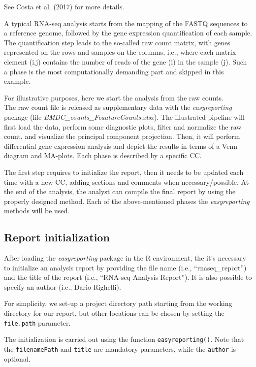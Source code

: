 \documentclass[
]{article}
\begin{document}
See Costa et al. (2017) for more details.

A typical RNA-seq analysis starts from the mapping of the FASTQ
sequences to a reference genome, followed by the gene expression
quantification of each sample. The quantification step leads to the
so-called raw count matrix, with genes represented on the rows and
samples on the columns, i.e., where each matrix element (i,j) contains
the number of reads of the gene (i) in the sample (j). Such a phase is
the most computationally demanding part and skipped in this example.

For illustrative purposes, here we start the analysis from the raw
counts.\\
The raw count file is released as supplementary data with the
\emph{easyreporting} package (file
\emph{BMDC\_counts\_FeaatureCounts.xlsx}). The illustrated pipeline will
first load the data, perform some diagnostic plots, filter and normalize
the raw count, and visualize the principal component projection. Then,
it will perform differential gene expression analysis and depict the
results in terms of a Venn diagram and MA-plots. Each phase is described
by a specific CC.

The first step requires to initialize the report, then it needs to be
updated each time with a new CC, adding sections and comments when
necessary/possible. At the end of the analysis, the analyst can compile
the final report by using the properly designed method. Each of the
above-mentioned phases the \emph{easyreporting} methods will be used.

\hypertarget{report-initialization}{%
\subsection{Report initialization}\label{report-initialization}}

After loading the \emph{easyreporting} package in the R environment, the
it's necessary to initialize an analysis report by providing the file
name (i.e., ``rnaseq\_report'') and the title of the report (i.e.,
``RNA-seq Analysis Report''). It is also possible to specify an author
(i.e., Dario Righelli).

For simplicity, we set-up a project directory path starting from the
working directory for our report, but other locations can be chosen by
setting the \texttt{file.path} parameter.

The initialization is carried out using the function
\texttt{easyreporting()}. Note that the \texttt{filenamePath} and
\texttt{title} are mandatory parameters, while the \texttt{author} is
optional.
\end{document}
